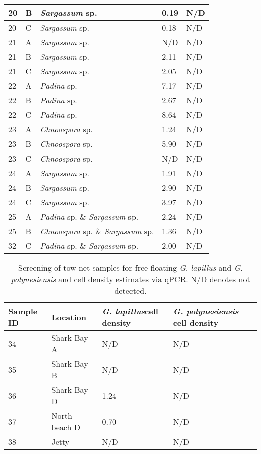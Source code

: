 \documentclass[12pt]{article}
\begin{document}
\begin{longtable}{ | p{2cm} | p{2cm} | p{3cm} | p{3.5cm} | p{3.5cm} | }
\hline
20
&B&\emph{Sargassum} sp.&0.19&N/D\\
\hline
20
&C&\emph{Sargassum} sp.&0.18&N/D\\
\hline
21
&A&\emph{Sargassum} sp.&N/D&N/D\\
\hline
21
&B&\emph{Sargassum} sp.&2.11&N/D\\
\hline
21
&C&\emph{Sargassum} sp.&2.05&N/D\\
\hline
22
&A&\emph{Padina} sp.&7.17&N/D\\
\hline
22
&B&\emph{Padina} sp.&2.67&N/D\\
\hline
22
&C&\emph{Padina} sp.&8.64&N/D\\
\hline
23&A&\emph{Chnoospora }sp.&1.24
&N/D\\
\hline
23&B&\emph{Chnoospora }sp.&5.90
&N/D\\
\hline
23&C&\emph{Chnoospora} sp.&N/D&N/D\\
\hline
24&A&\emph{Sargassum} sp.&1.91
&N/D\\
\hline
24&B&\emph{Sargassum} sp.&2.90
&N/D\\
\hline
24&C&\emph{Sargassum} sp.&3.97
&N/D\\
\hline
25&A&\emph{Padina} sp. \& \emph{Sargassum} sp.&2.24
&N/D\\
\hline
25&B&\emph{Chnoospora }sp. \& \emph{Sargassum} sp.&1.36
&N/D\\
\hline
32&C&\emph{Padina} sp. \& \emph{Sargassum} sp.&2.00
&N/D\\
\hline
\end{longtable}
\FloatBarrier
\FloatBarrier
\begin{table}
\caption{Screening of tow net samples for free floating \emph{G. lapillus} and \emph{G. polynesiensis} and cell density estimates via qPCR. N/D denotes not detected.}
\label{tbl:NetTable}
\begin{tabular}{ | p{4cm} | p{4cm} |p{4cm} | p{4cm} | }
\hline
\textbf{Sample ID}&\textbf{Location}&\textbf{\emph{G. lapillus}cell density}&\textbf{\emph{G. polynesiensis} cell density}\\
\hline
34&Shark Bay A&N/D&N/D\\ %
\hline
35&Shark Bay B&N/D&N/D\\
\hline
36&Shark Bay D&1.24
&N/D\\
\hline
37&North beach D&0.70
&N/D\\
\hline
38&Jetty&N/D
&N/D\\
\hline
\end{tabular}
\end{table}
\FloatBarrier
\newpage
\end{document}
